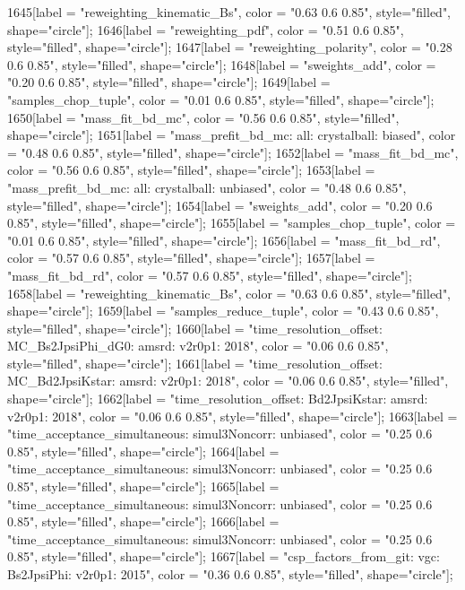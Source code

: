 {	1645[label = "reweighting_kinematic_Bs", color = "0.63 0.6 0.85", style="filled", shape="circle"];
	1646[label = "reweighting_pdf", color = "0.51 0.6 0.85", style="filled", shape="circle"];
	1647[label = "reweighting_polarity", color = "0.28 0.6 0.85", style="filled", shape="circle"];
	1648[label = "sweights_add", color = "0.20 0.6 0.85", style="filled", shape="circle"];
	1649[label = "samples_chop_tuple", color = "0.01 0.6 0.85", style="filled", shape="circle"];
	1650[label = "mass_fit_bd_mc", color = "0.56 0.6 0.85", style="filled", shape="circle"];
	1651[label = "mass_prefit_bd_mc\nmassbin: all\nmassmodel: crystalball\ntrigger: biased", color = "0.48 0.6 0.85", style="filled", shape="circle"];
	1652[label = "mass_fit_bd_mc", color = "0.56 0.6 0.85", style="filled", shape="circle"];
	1653[label = "mass_prefit_bd_mc\nmassbin: all\nmassmodel: crystalball\ntrigger: unbiased", color = "0.48 0.6 0.85", style="filled", shape="circle"];
	1654[label = "sweights_add", color = "0.20 0.6 0.85", style="filled", shape="circle"];
	1655[label = "samples_chop_tuple", color = "0.01 0.6 0.85", style="filled", shape="circle"];
	1656[label = "mass_fit_bd_rd", color = "0.57 0.6 0.85", style="filled", shape="circle"];
	1657[label = "mass_fit_bd_rd", color = "0.57 0.6 0.85", style="filled", shape="circle"];
	1658[label = "reweighting_kinematic_Bs", color = "0.63 0.6 0.85", style="filled", shape="circle"];
	1659[label = "samples_reduce_tuple", color = "0.43 0.6 0.85", style="filled", shape="circle"];
	1660[label = "time_resolution_offset\nmode: MC_Bs2JpsiPhi_dG0\ntimeres: amsrd\nversion: v2r0p1\nyear: 2018", color = "0.06 0.6 0.85", style="filled", shape="circle"];
	1661[label = "time_resolution_offset\nmode: MC_Bd2JpsiKstar\ntimeres: amsrd\nversion: v2r0p1\nyear: 2018", color = "0.06 0.6 0.85", style="filled", shape="circle"];
	1662[label = "time_resolution_offset\nmode: Bd2JpsiKstar\ntimeres: amsrd\nversion: v2r0p1\nyear: 2018", color = "0.06 0.6 0.85", style="filled", shape="circle"];
	1663[label = "time_acceptance_simultaneous\ntimeacc: simul3Noncorr\ntrigger: unbiased", color = "0.25 0.6 0.85", style="filled", shape="circle"];
	1664[label = "time_acceptance_simultaneous\ntimeacc: simul3Noncorr\ntrigger: unbiased", color = "0.25 0.6 0.85", style="filled", shape="circle"];
	1665[label = "time_acceptance_simultaneous\ntimeacc: simul3Noncorr\ntrigger: unbiased", color = "0.25 0.6 0.85", style="filled", shape="circle"];
	1666[label = "time_acceptance_simultaneous\ntimeacc: simul3Noncorr\ntrigger: unbiased", color = "0.25 0.6 0.85", style="filled", shape="circle"];
	1667[label = "csp_factors_from_git\ncsp: vgc\nmode: Bs2JpsiPhi\nversion: v2r0p1\nyear: 2015", color = "0.36 0.6 0.85", style="filled", shape="circle"];
}
